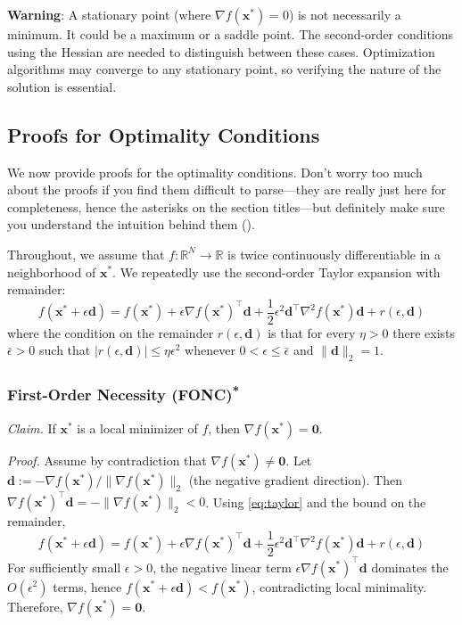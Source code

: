 \begin{warningBox}
    \textbf{Warning}: A stationary point (where $\nabla f(\mathbf{x}^*) = 0$) is not necessarily a minimum. It could be a maximum or a saddle point. The second-order conditions using the Hessian are needed to distinguish between these cases. Optimization algorithms may converge to any stationary point, so verifying the nature of the solution is essential.
\end{warningBox}

\subsection{Proofs for Optimality Conditions}
We now provide proofs for the optimality conditions. Don't worry too much about the proofs if you find them difficult to parse---they are really just here for completeness, hence the asterisks on the section titles---but definitely make sure you understand the intuition behind them ().

Throughout, we assume that $f:\mathbb{R}^N\to\mathbb{R}$ is twice continuously differentiable in a neighborhood of $\mathbf{x}^*$. We repeatedly use the second-order Taylor expansion with remainder:
\begin{equation}\label{eq:taylor}
f(\mathbf{x}^* + \epsilon \mathbf{d})
= f(\mathbf{x}^*) 
  + \epsilon \nabla f(\mathbf{x}^*)^\top \mathbf{d}
  + \frac{1}{2}\epsilon^2 \mathbf{d}^\top \nabla^2 f(\mathbf{x}^*) \mathbf{d}
  + r(\epsilon,\mathbf{d})
\end{equation}
where the condition on the remainder $r(\epsilon,\mathbf{d})$ is that for every $\eta>0$ there exists $\bar{\epsilon}>0$ such that 
$\bigl|r(\epsilon,\mathbf{d})\bigr|\le \eta \epsilon^2$ whenever $0<\epsilon\le \bar{\epsilon}$ and $\|\mathbf{d}\|_2=1$.

\subsubsection{\texorpdfstring{First-Order Necessity (FONC)\textsuperscript{*}}{First-Order Necessity (FONC)}}
\emph{Claim.} If $\mathbf{x}^*$ is a local minimizer of $f$, then $\nabla f(\mathbf{x}^*)=\mathbf{0}$.

\emph{Proof.}
Assume by contradiction that $\nabla f(\mathbf{x}^*)\neq \mathbf{0}$. Let $\mathbf{d} := -\nabla f(\mathbf{x}^*)/\|\nabla f(\mathbf{x}^*)\|_2$ (the negative gradient direction). Then $\nabla f(\mathbf{x}^*)^\top \mathbf{d} = -\|\nabla f(\mathbf{x}^*)\|_2 < 0$. Using \autoref{eq:taylor} and the bound on the remainder,
\begin{equation}
f(\mathbf{x}^* + \epsilon \mathbf{d})
= f(\mathbf{x}^*) + \epsilon \nabla f(\mathbf{x}^*)^\top \mathbf{d} 
  + \frac{1}{2}\epsilon^2 \mathbf{d}^\top \nabla^2 f(\mathbf{x}^*) \mathbf{d} + r(\epsilon,\mathbf{d})
\end{equation}
For sufficiently small $\epsilon>0$, the negative linear term $\epsilon \nabla f(\mathbf{x}^*)^\top \mathbf{d}$ dominates the $O(\epsilon^2)$ terms, hence
$f(\mathbf{x}^*+\epsilon \mathbf{d}) < f(\mathbf{x}^*)$, contradicting local minimality. Therefore, $\nabla f(\mathbf{x}^*)=\mathbf{0}$.

